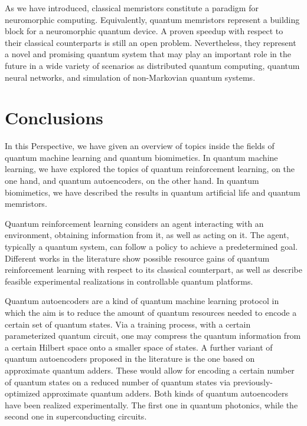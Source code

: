 \documentclass[12pt]{iopart}
\begin{document}
As we have introduced, classical memristors constitute a paradigm for neuromorphic computing. Equivalently, quantum memristors represent a building block for a neuromorphic quantum device. A proven speedup with respect to their classical counterparts is still an open problem. Nevertheless, they represent a novel and promising quantum system that may play an important role in the future in a wide variety of scenarios as distributed quantum computing, quantum neural networks, and simulation of non-Markovian quantum systems.




\section{Conclusions\label{Conclusions}}

In this Perspective, we have given an overview of topics inside the fields of quantum machine learning and quantum biomimetics. In quantum machine learning, we have explored the topics of quantum reinforcement learning, on the one hand, and quantum autoencoders, on the other hand. In quantum biomimetics, we have described the results in quantum artificial life and quantum memristors.

Quantum reinforcement learning considers an agent interacting with an environment, obtaining information from it, as well as acting on it. The agent, typically a quantum system, can follow a policy to achieve a predetermined goal. Different works in the literature show possible resource gains of quantum reinforcement learning with respect to its classical counterpart, as well as describe feasible experimental realizations in controllable quantum platforms.

Quantum autoencoders are a kind of quantum machine learning protocol in which the aim is to reduce the amount of quantum resources needed to encode a certain set of quantum states. Via a training process, with a certain parameterized quantum circuit, one may compress the quantum information from a certain Hilbert space onto a smaller space of states. A further variant of quantum autoencoders proposed in the literature is the one based on approximate quantum adders. These would allow for encoding a certain number of quantum states on a reduced number of quantum states via previously-optimized approximate quantum adders. Both kinds of quantum autoencoders have been realized experimentally. The first one in quantum photonics, while the second one in superconducting circuits.
\end{document}
